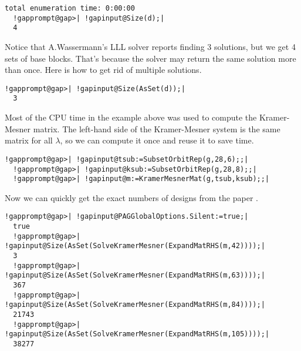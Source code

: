 \documentclass[a4paper,11pt]{report}
\begin{document}
{{{\begin{Verbatim}[commandchars=!@|,fontsize=\small,frame=single,label=Example]
  total enumeration time: 0:00:00
  !gapprompt@gap>| !gapinput@Size(d);|
  4
\end{Verbatim}
 Notice that A.{\nobreakspace}Wassermann's LLL solver \cite{AW98} reports finding 3 solutions, but we get 4 sets of base blocks. That's because
the solver may return the same solution more than once. Here is how to get rid
of multiple solutions. 
\begin{Verbatim}[commandchars=!@|,fontsize=\small,frame=single,label=Example]
  !gapprompt@gap>| !gapinput@Size(AsSet(d));|
  3
\end{Verbatim}
 Most of the CPU time in the example above was used to compute the
Kramer-Mesner matrix. The left-hand side of the Kramer-Mesner system is the
same matrix for all $\lambda$, so we can compute it once and reuse it to save time. 
\begin{Verbatim}[commandchars=!@|,fontsize=\small,frame=single,label=Example]
  !gapprompt@gap>| !gapinput@tsub:=SubsetOrbitRep(g,28,6);;|
  !gapprompt@gap>| !gapinput@ksub:=SubsetOrbitRep(g,28,8);;|
  !gapprompt@gap>| !gapinput@m:=KramerMesnerMat(g,tsub,ksub);;|
\end{Verbatim}
 Now we can quickly get the exact numbers of designs from the paper \cite{BS93}. 
\begin{Verbatim}[commandchars=!@|,fontsize=\small,frame=single,label=Example]
  !gapprompt@gap>| !gapinput@PAGGlobalOptions.Silent:=true;|
  true
  !gapprompt@gap>| !gapinput@Size(AsSet(SolveKramerMesner(ExpandMatRHS(m,42))));|
  3
  !gapprompt@gap>| !gapinput@Size(AsSet(SolveKramerMesner(ExpandMatRHS(m,63))));|
  367
  !gapprompt@gap>| !gapinput@Size(AsSet(SolveKramerMesner(ExpandMatRHS(m,84))));|
  21743
  !gapprompt@gap>| !gapinput@Size(AsSet(SolveKramerMesner(ExpandMatRHS(m,105))));|
  38277
\end{Verbatim}
 }

 
}}
\end{document}
